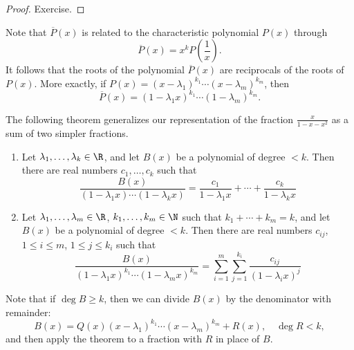\begin{page}


\begin{proof}
Exercise.
\end{proof}

Note that $\overline{P}(x)$ is related to the characteristic polynomial $P(x)$ through
\[
\overline{P}(x) = x^k P\left(\frac1x\right).
\]
It follows that the roots of the polynomial $\overline{P}(x)$ are reciprocals of the roots of $P(x)$.
More exactly, if $P(x) = (x - \lambda_1)^{k_1} \cdots (x - \lambda_m)^{k_m}$, then
\[
\overline{P}(x) = (1 - \lambda_1 x)^{k_1} \cdots (1- \lambda_m)^{k_m}.
\]

The following theorem generalizes our representation of the fraction $\frac{x}{1-x-x^2}$ as a sum of two simpler fractions.

\end{page}

\begin{page}

\begin{thm}
\begin{enumerate}
\item
Let $\lambda_1, \ldots, \lambda_k \in \R$, and let $B(x)$ be a polynomial of degree $< k$.
Then there are real numbers $c_1, \ldots, c_k$ such that
\[
\frac{B(x)}{(1-\lambda_1 x) \cdots (1-\lambda_k x)} = \frac{c_1}{1-\lambda_1 x} + \cdots + \frac{c_k}{1-\lambda_k x}
\]
\item
Let $\lambda_1, \ldots, \lambda_m \in \R$, $k_1, \ldots, k_m \in \N$ such that $k_1 + \cdots + k_m = k$,
and let $B(x)$ be a polynomial of degree $< k$.
Then there are real numbers $c_{ij}$, $1 \le i \le m$, $1 \le j \le k_i$ such that
\[
\frac{B(x)}{(1-\lambda_1 x)^{k_1} \cdots (1-\lambda_m x)^{k_m}} = \sum_{i=1}^m \sum_{j=1}^{k_i} \frac{c_{ij}}{(1-\lambda_i x)^j}
\]
\end{enumerate}
\end{thm}

\end{page}

\begin{page}

\begin{rem}
Note that if $\deg B \ge k$, then we can divide $B(x)$ by the denominator with remainder:
\[
B(x) = Q(x) (x-\lambda_1)^{k_1} \cdots (x-\lambda_m)^{k_m} + R(x), \quad \deg R < k,
\]
and then apply the theorem to a fraction with $R$ in place of $B$.
\end{rem}

\end{page}

